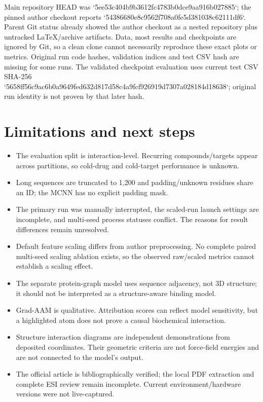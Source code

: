 Main repository HEAD was `5ee53c404b9b3612fc4783b0dce9aa916b027885`; the pinned author checkout reports `54386680e8c9562f708a0fe5d381038c62111df6`. Parent Git status already showed the author checkout as a nested repository plus untracked LaTeX/archive artifacts. Data, most results and checkpoints are ignored by Git, so a clean clone cannot necessarily reproduce these exact plots or metrics. Original run code hashes, validation indices and test CSV hash are missing for some runs. The validated checkpoint evaluation uses current test CSV SHA-256 `5658ff56c9ac6b0a9649fed632d817d58c4a9fcf926919d7307a028184d18638`; original run identity is not proven by that later hash.

\section{Limitations and next steps}
\begin{itemize}
\item The evaluation split is interaction-level. Recurring compounds/targets appear across partitions, so cold-drug and cold-target performance is unknown.
\item Long sequences are truncated to 1,200 and padding/unknown residues share an ID; the MCNN has no explicit padding mask.
\item The primary run was manually interrupted, the scaled-run launch settings are incomplete, and multi-seed process statuses conflict. The reasons for result differences remain unresolved.
\item Default feature scaling differs from author preprocessing. No complete paired multi-seed scaling ablation exists, so the observed raw/scaled metrics cannot establish a scaling effect.
\item The separate protein-graph model uses sequence adjacency, not 3D structure; it should not be interpreted as a structure-aware binding model.
\item Grad-AAM is qualitative. Attribution scores can reflect model sensitivity, but a highlighted atom does not prove a causal biochemical interaction.
\item Structure interaction diagrams are independent demonstrations from deposited coordinates. Their geometric criteria are not force-field energies and are not connected to the model’s output.
\item The official article is bibliographically verified; the local PDF extraction and complete ESI review remain incomplete. Current environment/hardware versions were not live-captured.
\end{itemize}


